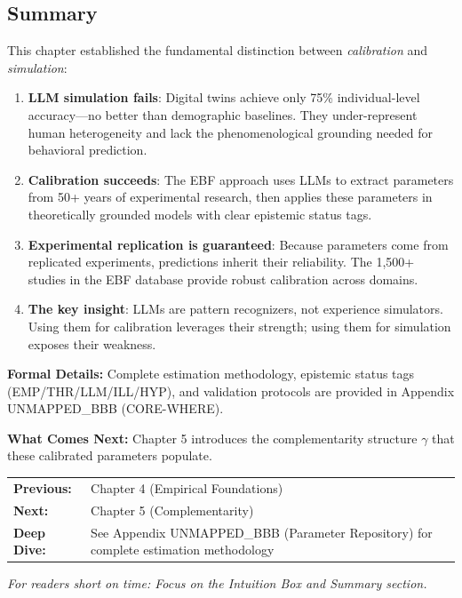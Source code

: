 \subsection{Summary}
\label{sec:ch4x-summary}

This chapter established the fundamental distinction between \emph{calibration} and \emph{simulation}:

\begin{enumerate}
\item \textbf{LLM simulation fails}: Digital twins achieve only 75\% individual-level accuracy---no better than demographic baselines. They under-represent human heterogeneity and lack the phenomenological grounding needed for behavioral prediction.

\item \textbf{Calibration succeeds}: The EBF approach uses LLMs to extract parameters from 50+ years of experimental research, then applies these parameters in theoretically grounded models with clear epistemic status tags.

\item \textbf{Experimental replication is guaranteed}: Because parameters come from replicated experiments, predictions inherit their reliability. The 1,500+ studies in the EBF database provide robust calibration across domains.

\item \textbf{The key insight}: LLMs are pattern recognizers, not experience simulators. Using them for calibration leverages their strength; using them for simulation exposes their weakness.
\end{enumerate}

\textbf{Formal Details:} Complete estimation methodology, epistemic status tags (EMP/THR/LLM/ILL/HYP), and validation protocols are provided in Appendix UNMAPPED_BBB (CORE-WHERE).

\textbf{What Comes Next:} Chapter 5 introduces the complementarity structure $\gamma$ that these calibrated parameters populate.

\begin{tcolorbox}[
    colback=green!5!white,
    colframe=green!75!black,
    title={\textbf{Reading Path}},
    fonttitle=\bfseries
]
\begin{tabular}{@{}ll@{}}
\textbf{Previous:} & Chapter 4 (Empirical Foundations) \\
\textbf{Next:} & Chapter 5 (Complementarity) \\
\textbf{Deep Dive:} & See Appendix UNMAPPED_BBB (Parameter Repository) for complete estimation methodology \\
\end{tabular}

\medskip
\textit{For readers short on time: Focus on the Intuition Box and Summary section.}
\end{tcolorbox}

